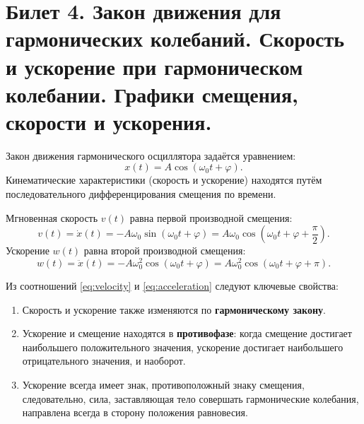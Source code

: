 \section{Билет 4. Закон движения для гармонических колебаний. Скорость и ускорение при гармоническом колебании. Графики смещения, скорости и ускорения.}

\begin{definition}
Закон движения гармонического осциллятора задаётся уравнением:
\begin{equation}
    x(t) = A \cos(\omega_0 t + \varphi).
\end{equation}
Кинематические характеристики (скорость и ускорение) находятся путём последовательного дифференцирования смещения по времени.
\end{definition}

\begin{theorem}
Мгновенная скорость $v(t)$ равна первой производной смещения:
\begin{equation}
    v(t) = \dot{x}(t) = -A\omega_0 \sin(\omega_0 t + \varphi) = A\omega_0 \cos\left(\omega_0 t + \varphi + \frac{\pi}{2}\right). \label{eq:velocity}
\end{equation}
Ускорение $w(t)$ равна второй производной смещения:
\begin{equation}
    w(t) = \ddot{x}(t) = -A\omega_0^2 \cos(\omega_0 t + \varphi) = A\omega_0^2 \cos(\omega_0 t + \varphi + \pi). \label{eq:acceleration}
\end{equation}
\end{theorem}

\begin{property}
Из соотношений \eqref{eq:velocity} и \eqref{eq:acceleration} следуют ключевые свойства:
\begin{enumerate}
    \item Скорость и ускорение также изменяются по \textbf{гармоническому закону}.
    \item Ускорение и смещение находятся в \textbf{противофазе}: когда смещение достигает наибольшего положительного значения, ускорение достигает наибольшего отрицательного значения, и наоборот.
    \item Ускорение всегда имеет знак, противоположный знаку смещения, следовательно, сила, заставляющая тело совершать гармонические колебания, направлена всегда в сторону положения равновесия.
\end{enumerate}
\end{property}

